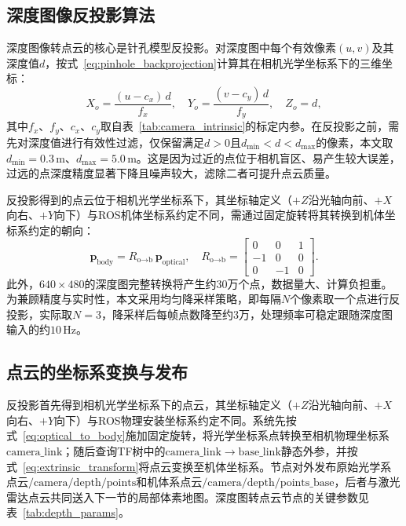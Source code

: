 \subsection{深度图像反投影算法}
深度图像转点云的核心是针孔模型反投影。对深度图中每个有效像素$(u,v)$及其深度值$d$，按式~\eqref{eq:pinhole_backprojection}计算其在相机光学坐标系下的三维坐标：
\begin{equation}
    X_o = \frac{(u-c_x)\,d}{f_x},
    \quad
    Y_o = \frac{(v-c_y)\,d}{f_y},
    \quad
    Z_o = d,
    \label{eq:depth_backproject}
\end{equation}
其中$f_x$、$f_y$、$c_x$、$c_y$取自表~\ref{tab:camera_intrinsic}的标定内参。在反投影之前，需先对深度值进行有效性过滤，仅保留满足$d>0$且$d_{\min}<d<d_{\max}$的像素，本文取$d_{\min}=0.3\,\mathrm{m}$、$d_{\max}=5.0\,\mathrm{m}$。这是因为过近的点位于相机盲区、易产生较大误差，过远的点深度精度显著下降且噪声较大，滤除二者可提升点云质量。

反投影得到的点云位于相机光学坐标系下，其坐标轴定义（$+Z$沿光轴向前、$+X$向右、$+Y$向下）与ROS机体坐标系约定不同，需通过固定旋转将其转换到机体坐标系约定的朝向：
\begin{equation}
    \mathbf{p}_{\text{body}}
    =
    R_{\text{o}\to\text{b}}\,
    \mathbf{p}_{\text{optical}},
    \quad
    R_{\text{o}\to\text{b}}
    =
    \begin{bmatrix}
        0 & 0 & 1 \\
        -1 & 0 & 0 \\
        0 & -1 & 0
    \end{bmatrix}.
    \label{eq:optical_to_body}
\end{equation}
此外，$640\times480$的深度图完整转换将产生约$30$万个点，数据量大、计算负担重。为兼顾精度与实时性，本文采用均匀降采样策略，即每隔$N$个像素取一个点进行反投影，实际取$N=3$，降采样后每帧点数降至约$3$万，处理频率可稳定跟随深度图输入的约$10\,\mathrm{Hz}$。

\subsection{点云的坐标系变换与发布}
反投影首先得到相机光学坐标系下的点云，其坐标轴定义（$+Z$沿光轴向前、$+X$向右、$+Y$向下）与ROS物理安装坐标系约定不同。系统先按式~\eqref{eq:optical_to_body}施加固定旋转，将光学坐标系点转换至相机物理坐标系$\mathrm{camera\_link}$；随后查询TF树中的$\mathrm{camera\_link}\to\mathrm{base\_link}$静态外参，并按式~\eqref{eq:extrinsic_transform}将点云变换至机体坐标系。节点对外发布原始光学系点云$\mathrm{/camera/depth/points}$和机体系点云$\mathrm{/camera/depth/points\_base}$，后者与激光雷达点云共同送入下一节的局部体素地图。深度图转点云节点的关键参数见表~\ref{tab:depth_params}。

